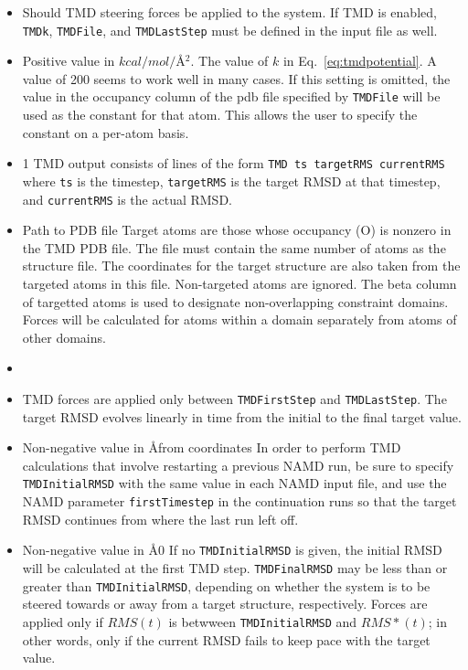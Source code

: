 \begin{itemize}
\item
{}
{Should TMD steering forces be applied to the system.  If TMD is enabled,
{\tt TMDk}, {\tt TMDFile}, and {\tt TMDLastStep} must be defined in the 
input file as well.}

\item
{}
{Positive value in $kcal/mol/$\AA$^2$.}
{The value of $k$ in Eq.~\ref{eq:tmdpotential}.  A value of 200 seems to work
well in many cases.  If this setting is omitted, the value in the occupancy column
of the pdb file specified by {\tt TMDFile} will be used as the constant for that atom.  
This allows the user to specify the constant on a per-atom basis.}

\item
{}
{1} 
{ TMD output consists of lines of the form {\tt TMD  ts  targetRMS  currentRMS}
where {\tt ts} is the timestep, {\tt targetRMS} is the target RMSD at that 
timestep, and {\tt currentRMS} is the actual RMSD.}

\item
{}
{Path to PDB file}
{
Target atoms are those whose occupancy (O) is nonzero in the TMD PDB file.
The file must contain the same number of atoms as the structure file.  The
coordinates for the target structure are also taken from the targeted
atoms in this file.  Non-targeted atoms are ignored.  The beta column of targetted
atoms is used to designate non-overlapping constraint domains.  Forces will be
calculated for atoms within a domain separately from atoms of other domains.
}

\item
{} {}
\item
{}
{ TMD forces are applied only between {\tt TMDFirstStep} and {\tt TMDLastStep}.
The target RMSD evolves linearly in time from the initial to the final target 
value.  }

\item
{}
{Non-negative value in \AA}{from coordinates}{
In order to perform TMD calculations that involve restarting a previous
NAMD run, be sure to specify {\tt TMDInitialRMSD} with the same value
in each NAMD input file, and use the NAMD parameter {\tt firstTimestep}
in the continuation runs so that the target RMSD continues from where the
last run left off.
}
\item
{}
{Non-negative value in \AA}{0}
{If no {\tt TMDInitialRMSD} is given, the initial RMSD will be calculated at the
first TMD step.  {\tt TMDFinalRMSD} may be less than or greater than
{\tt TMDInitialRMSD}, depending on whether the system is to be steered 
towards or away from a target structure, respectively.  Forces are applied
only if $RMS(t)$ is betwween {\tt TMDInitialRMSD} and $RMS*(t)$; in other
words, only if the current RMSD fails to keep pace with the target value.}


\end{itemize}
